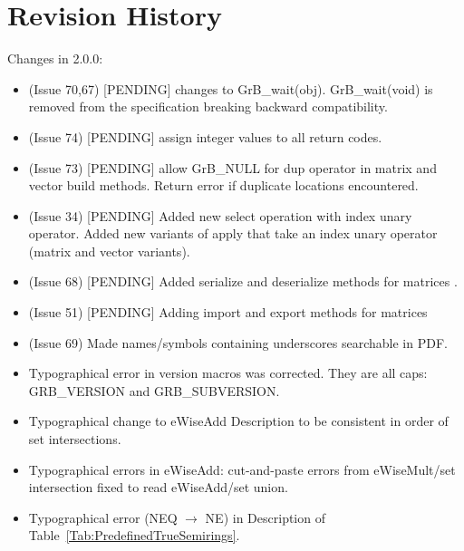 \chapter{Revision History}
\label{Chp:RevHistory}

Changes in 2.0.0:
\begin{itemize}
\item (Issue 70,67) [PENDING] changes to {\sf GrB\_wait(obj)}. {\sf GrB\_wait(void)} is removed from the specification breaking backward compatibility.
\item (Issue 74) [PENDING] assign integer values to all return codes.
\item (Issue 73) [PENDING] allow {\sf GrB\_NULL} for dup operator in matrix and vector {\sf build} methods.  Return error if duplicate locations encountered.
\item (Issue 34) [PENDING] Added new select operation with index unary operator. Added new variants of apply that take an index unary operator (matrix and vector variants).
\item (Issue 68) [PENDING] Added serialize and deserialize methods for matrices .
\item (Issue 51) [PENDING] Adding import and export methods for matrices
\item (Issue 69) Made names/symbols containing underscores searchable in PDF.
\item Typographical error in version macros was corrected.  They are all caps: {\sf GRB\_VERSION} and {\sf GRB\_SUBVERSION}.
\item Typographical change to eWiseAdd Description to be consistent in order of set intersections.
\item Typographical errors in eWiseAdd: cut-and-paste errors from eWiseMult/set intersection fixed to read eWiseAdd/set union.
\item Typographical error ({\sf NEQ} $\rightarrow$ {\sf NE}) in Description of Table~\ref{Tab:PredefinedTrueSemirings}.
\end{itemize}


